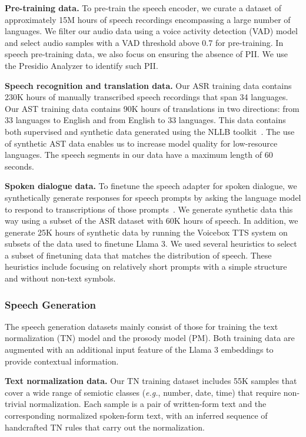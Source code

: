 \textbf{Pre-training data.} To pre-train the speech encoder, we curate a dataset of approximately 15M hours of speech recordings encompassing a large number of languages. We filter our audio data using a voice activity detection (VAD) model and select audio samples with a VAD threshold above 0.7 for pre-training. In speech pre-training data, we also focus on ensuring the absence of PII. We use the Presidio Analyzer to identify such PII. 

\textbf{Speech recognition and translation data.} Our ASR training data contains 230K hours of manually transcribed speech recordings that span 34 languages. Our AST training data contains 90K hours of translations in two directions: from 33 languages to English and from English to 33 languages. This data contains both supervised and synthetic data generated using the NLLB toolkit~\citep{nllb2022}. The use of synthetic AST data enables us to increase model quality for low-resource languages. The speech segments in our data have a maximum length of 60 seconds.

\textbf{Spoken dialogue data.} To finetune the speech adapter for spoken dialogue, we synthetically generate responses for speech prompts by asking the language model to respond to transcriptions of those prompts~\citep{fathullah2024audiochatllama}. We generate synthetic data this way using a subset of the ASR dataset with 60K hours of speech. In addition, we generate 25K hours of synthetic data by running the Voicebox TTS system \citep{le2024voicebox} on subsets of the data used to finetune Llama 3. We used several heuristics to select a subset of finetuning data that matches the distribution of speech. These heuristics include focusing on relatively short prompts with a simple structure and without non-text symbols.

\subsubsection{Speech Generation}
\label{sec:data:tts}
The speech generation datasets mainly consist of those for training the text normalization (TN) model and the prosody model (PM).  Both training data are augmented with an additional input feature of the Llama 3 embeddings to provide contextual information.

\textbf{Text normalization data.} Our TN training dataset includes 55K samples that cover a wide range of semiotic classes (\emph{e.g.}, number, date, time) that require non-trivial normalization. Each sample is a pair of written-form text and the corresponding normalized spoken-form text, with an inferred sequence of handcrafted TN rules that carry out the normalization.

